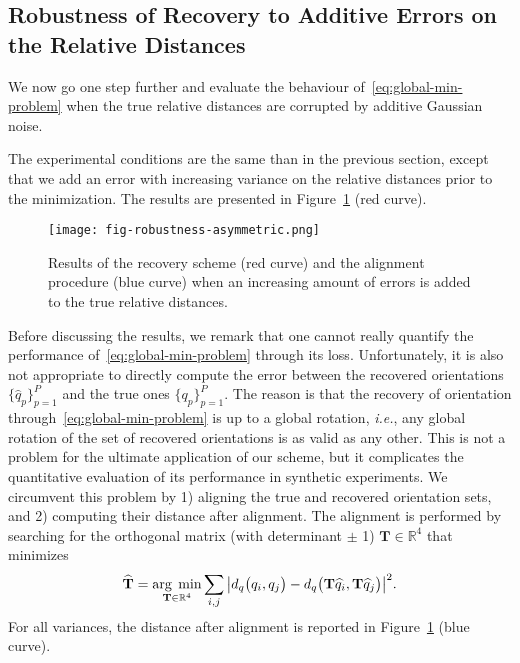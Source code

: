 \subsection{Robustness of Recovery to Additive Errors on the Relative Distances}
\label{subsec:5-6-4-robustness-to-errors}

We now go one step further and evaluate the behaviour of~\eqref{eq:global-min-problem} when the true relative distances are corrupted by  additive Gaussian noise. 

The experimental conditions are the same than in the previous section, except that we add an error with increasing variance on the relative distances prior to the minimization. The results are presented in Figure~\ref{fig:recovery-noise-distances} (red curve).   

\begin{figure}
    \centering
    \texttt{[image: fig-robustness-asymmetric.png]}
    \caption{Results of the recovery scheme (red curve) and the alignment procedure (blue curve) when an increasing amount of errors is added to the true relative distances.} 
    \label{fig:recovery-noise-distances}
\end{figure}

Before discussing the results, we remark that one cannot really quantify the performance of~\eqref{eq:global-min-problem} through its loss. Unfortunately, it is also not appropriate to directly compute the error between the recovered orientations $\big\{\widehat{q}_p\big\}_{p=1}^P$ and the true ones $\big\{q_p\big\}_{p=1}^P$. The reason is that the recovery of orientation through~\eqref{eq:global-min-problem} is up to a global rotation, \textit{i.e.}, any global rotation of the set of recovered orientations is as valid as any other. This is not a problem for the ultimate application of our scheme, but it complicates the quantitative evaluation of its performance in synthetic experiments. We circumvent this problem by 1) aligning the true and recovered orientation sets, and 2) computing their distance after alignment. The alignment is performed by searching for the orthogonal matrix (with determinant $\pm$ 1) $\mathbf{T}\in\mathbb{R}^4$  that minimizes 
\begin{equation}
    \label{eq:alignement}
    \widehat{\mathbf{T}}=\underset{\mathbf{T}\in\mathbb{R}^4}{\arg\;\min}\sum_{i,j} \big|d_q\big(q_i,q_j\big)- d_q\big(\mathbf{T}\widehat{q}_i,\mathbf{T}\widehat{q}_j\big)\big|^2.
\end{equation}
For all variances, the distance after alignment is reported in Figure~\ref{fig:recovery-noise-distances} (blue curve).  

